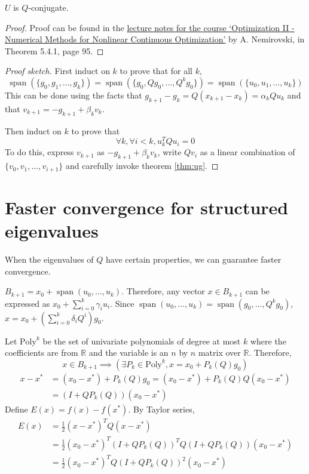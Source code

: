 \begin{theorem}
$U$ is $Q$-conjugate.
\end{theorem}
\begin{proof}
Proof can be found in the
\href{https://www2.isye.gatech.edu/~nemirovs/Lect_OptII.pdf}{
lecture notes for the course
`Optimization II - Numerical Methods for Nonlinear Continuous Optimization'}
by A. Nemirovski, in Theorem 5.4.1, page 95.
\end{proof}

\begin{proof}[Proof sketch]
First induct on $k$ to prove that for all $k$,
\[ \operatorname{span}(\{g_0, g_1, \ldots, g_k\})
= \operatorname{span}(\{g_0, Qg_0, \ldots, Q^kg_0\})
= \operatorname{span}(\{u_0, u_1, \ldots, u_k\}) \]
This can be done using the facts that $g_{k+1} - g_k = Q(x_{k+1} - x_k) = \alpha_kQu_k$
and that $v_{k+1} = -g_{k+1} + \beta_k v_k$.

Then induct on $k$ to prove that
\[ \forall k, \forall i < k, u_k^TQu_i = 0 \]
To do this, express $v_{k+1}$ as $-g_{k+1} + \beta_k v_k$,
write $Qv_i$ as a linear combination of $\{v_0, v_1, \ldots, v_{i+1}\}$
and carefully invoke theorem \ref{thm:ug}.
\end{proof}

\section{Faster convergence for structured eigenvalues}

\newcommand*{\MatPoly}[1]{\textrm{Poly}^{#1}}

When the eigenvalues of $Q$ have certain properties,
we can guarantee faster convergence.

$B_{k+1} = x_0 + \operatorname{span}(u_0, \ldots, u_k)$.
Therefore, any vector $x \in B_{k+1}$ can be expressed as $x_0 + \sum_{i=0}^k \gamma_i u_i$.
Since $\operatorname{span}(u_0, \ldots, u_k) = \operatorname{span}(g_0, \ldots, Q^kg_0)$,
$x = x_0 + \left(\sum_{i=0}^k \delta_i Q^i\right)g_0$.

Let $\MatPoly{k}$ be the set of univariate polynomials of degree at most $k$
where the coefficients are from $\mathbb{R}$ and the variable is
an $n$ by $n$ matrix over $\mathbb{R}$. Therefore,
\[ x \in B_{k+1} \implies \left( \exists P_k \in \MatPoly{k}, x = x_0 + P_k(Q)g_0 \right) \]
\begin{align*}
x - x^* &= (x_0 - x^*) + P_k(Q)g_0
= (x_0 - x^*) + P_k(Q)Q(x_0 - x^*)
\\ &= (I + QP_k(Q))(x_0 - x^*)
\end{align*}
Define $E(x) = f(x) - f(x^*)$.
By Taylor series,
\begin{align*}
E(x) &= \frac{1}{2} (x-x^*)^TQ(x-x^*)
\\ &= \frac{1}{2} (x_0 - x^*)^T(I + QP_k(Q))^TQ(I+QP_k(Q))(x_0 - x^*)
\\ &= \frac{1}{2} (x_0 - x^*)^T Q(I + QP_k(Q))^2 (x_0 - x^*)
\end{align*}

